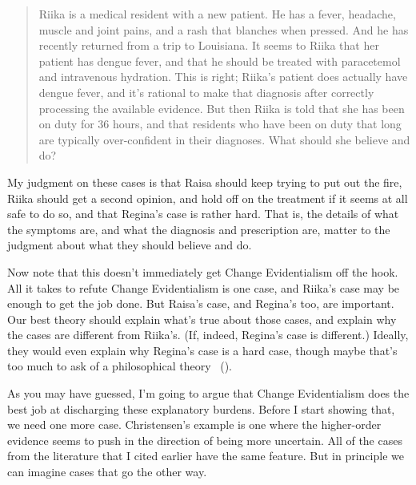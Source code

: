 \documentclass[
  10pt,
  letterpaper,
  twoside]{scrbook}
\begin{document}
\begin{quote}
{Riika} is a medical resident with a new patient. He has a fever,
headache, muscle and joint pains, and a rash that blanches when pressed.
And he has recently returned from a trip to Louisiana. It seems to
{Riika} that her patient has dengue fever, and that he should be treated
with paracetemol and intravenous hydration. This is right; {Riika}'s
patient does actually have dengue fever, and it's rational to make that
diagnosis after correctly processing the available evidence. But then
{Riika} is told that she has been on duty for 36 hours, and that
residents who have been on duty that long are typically over-confident
in their diagnoses. What should she believe and do?
\end{quote}

My judgment on these cases is that {Raisa} should keep trying to put out
the fire, {Riika} should get a second opinion, and hold off on the
treatment if it seems at all safe to do so, and that {Regina}'s case is
rather hard. That is, the details of what the symptoms are, and what the
diagnosis and prescription are, matter to the judgment about what they
should believe and do.

Now note that this doesn't immediately get Change Evidentialism off the
hook. All it takes to refute Change Evidentialism is one case, and
{Riika}'s case may be enough to get the job done. But {Raisa}'s case,
and {Regina}'s too, are important. Our best theory should explain what's
true about those cases, and explain why the cases are different from
{Riika}'s. (If, indeed, Regina's case is different.) Ideally, they would
even explain why {Regina}'s case is a hard case, though maybe that's too
much to ask of a philosophical theory
~().

As you may have guessed, I'm going to argue that Change Evidentialism
does the best job at discharging these explanatory burdens. Before I
start showing that, we need one more case. Christensen's example is one
where the higher-order evidence seems to push in the direction of being
more uncertain. All of the cases from the literature that I cited
earlier have the same feature. But in principle we can imagine cases
that go the other way.
\end{document}
